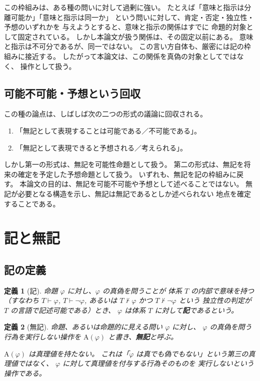 \documentclass[11pt,a4paper,ja=standard,lualatex]{bxjsarticle}
\newtheorem{definition}{定義}
\begin{document}
この枠組みは、ある種の問いに対して過剰に強い。
たとえば「意味と指示は分離可能か」「意味と指示は同一か」
という問いに対して、肯定・否定・独立性・予想のいずれかを
与えようとすると、意味と指示の関係はすでに
命題的対象として固定されている。
しかし本論文が扱う関係は、その固定以前にある。
意味と指示は不可分であるが、同一ではない。
この言い方自体も、厳密には記の枠組みに接近する。
したがって本論文は、この関係を真偽の対象としてではなく、
操作として扱う。

\subsection{可能不可能・予想という回収}

この種の論点は、しばしば次の二つの形式の議論に回収される。

\begin{enumerate}
\item 「無記として表現することは可能である／不可能である」。
\item 「無記として表現できると予想される／考えられる」。
\end{enumerate}

しかし第一の形式は、無記を可能性命題として扱う。
第二の形式は、無記を将来の確定を予定した予想命題として扱う。
いずれも、無記を記の枠組みに戻す。
本論文の目的は、無記を可能不可能や予想として述べることではない。
無記が必要となる構造を示し、無記は無記であるとしか述べられない
地点を確定することである。

\section{記と無記}

\subsection{記の定義}

\begin{definition}[記]
命題 $\varphi$ に対し、$\varphi$ の真偽を問うことが
体系 $T$ の内部で意味を持つ（すなわち $T \vdash \varphi$,
$T \vdash \neg\varphi$, あるいは
$T \nvdash \varphi$ かつ $T \nvdash \neg\varphi$ という
独立性の判定が $T$ の言語で記述可能である）とき、
$\varphi$ は体系 $T$ に対して\textbf{記}であるという。
\end{definition}

\begin{definition}[無記]
命題、あるいは命題的に見える問い $\varphi$ に対し、
$\varphi$ の真偽を問う行為を実行しない操作を
$\mathrm{A}(\varphi)$ と書き、\textbf{無記}と呼ぶ。

$\mathrm{A}(\varphi)$ は真理値を持たない。
これは「$\varphi$ は真でも偽でもない」という第三の真理値ではなく、
$\varphi$ に対して真理値を付与する行為そのものを
実行しないという操作である。
\end{definition}
\end{document}
